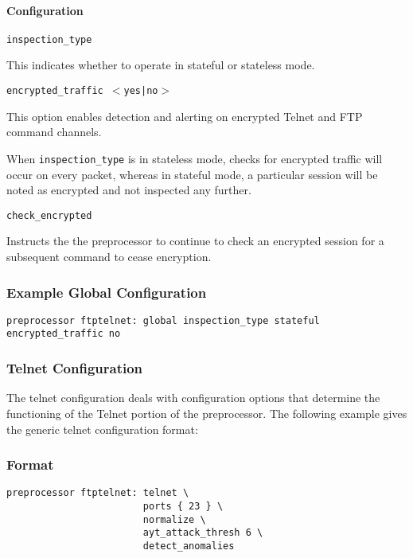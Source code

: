 \documentclass[english]{report}
\newcounter{slistnum}
\newenvironment{slist}
{ \begin{list}{ {\bf \arabic{slistnum}.} }{\usecounter{slistnum} } }
{ \end{list} }
\newenvironment{note}{
\samepage
    \vspace{10pt}{\textsf{
        {\hspace{7pt}\Huge{$\triangle$\hspace{-12.5pt}{\Large{$^!$}}}}\hspace{5pt}
        {\Large{NOTE}}
    }
    }
   \begin{center}
    \par\vspace{-17pt}

    \begin{lrbox}{\savepar}
    \begin{minipage}[r]{6in}
}
{
    \end{minipage}
    \end{lrbox}
    \fbox{
        \usebox{
            \savepar
	}
    }
    \par\vskip10pt
    \end{center}
}
\newenvironment{note}{
        \begin{rawhtml}
        <p><table border="1"><tr><td><b>
        Note:&nbsp;&nbsp;</b>
        \end{rawhtml}
}{
        \begin{rawhtml}
        </b></td></tr></table></p>
        \end{rawhtml}
}
\begin{document}
\paragraph{Configuration}
\begin{slist}
\item \texttt{inspection\_type}

This indicates whether to operate in stateful or stateless mode.

\item \texttt{encrypted\_traffic $<$yes|no$>$}

This option enables detection and alerting on encrypted Telnet and
FTP command channels.

\begin{note}
When \texttt{inspection\_type} is in stateless mode, checks for encrypted
traffic will occur on every packet, whereas in stateful mode, a particular
session will be noted as encrypted and not inspected any further.
\end{note}

\item \texttt{check\_encrypted}

Instructs the the preprocessor to continue to check an encrypted session
for a subsequent command to cease encryption.

\end{slist}

\subsubsection{Example Global Configuration}

\begin{verbatim}
preprocessor ftptelnet: global inspection_type stateful encrypted_traffic no
\end{verbatim}

\subsubsection{Telnet Configuration}

The telnet configuration deals with configuration options that determine the
functioning of the Telnet portion of the preprocessor.  The following
example gives the generic telnet configuration format:

\subsubsection{Format}
\begin{verbatim}
preprocessor ftptelnet: telnet \
                        ports { 23 } \
                        normalize \
                        ayt_attack_thresh 6 \
                        detect_anomalies

\end{verbatim}
\end{document}
